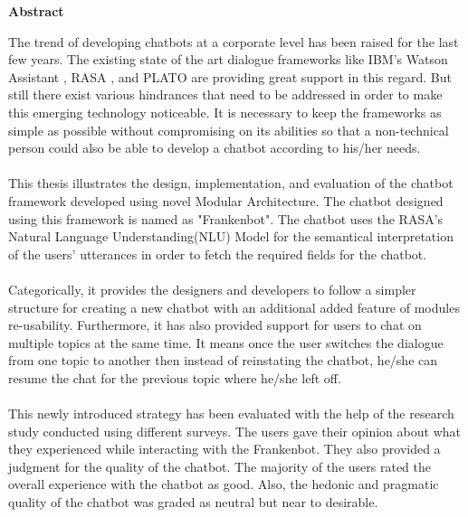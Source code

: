 \thispagestyle{empty}
\vspace*{1.0cm}

\begin{center}
    \textbf{Abstract}
\end{center}

\vspace*{0.5cm}

\noindent
The trend of developing chatbots at a corporate level has been raised for the last few years. The existing state of the art dialogue frameworks like IBM's Watson Assistant \cite{ibmwatson}, RASA \cite{rasa}, and PLATO \cite{plato} are providing great support in this regard. But still there exist various hindrances that need to be addressed in order to make this emerging technology noticeable. It is necessary to keep the frameworks as simple as possible without compromising on its abilities so that a non-technical person could also be able to develop a chatbot according to his/her needs.
\\~\\
This thesis illustrates the design, implementation, and evaluation of the chatbot framework developed using novel Modular Architecture. The chatbot designed using this framework is named as "Frankenbot". The chatbot uses the RASA's Natural Language Understanding(NLU) Model for the semantical interpretation of the users' utterances in order to fetch the required fields for the chatbot. 
\\~\\
Categorically, it provides the designers and developers to follow a simpler structure for creating a new chatbot with an additional added feature of modules re-usability. Furthermore, it has also provided support for users to chat on multiple topics at the same time. It means once the user switches the dialogue from one topic to another then instead of reinstating the chatbot, he/she can resume the chat for the previous topic where he/she left off.
\\~\\
This newly introduced strategy has been evaluated with the help of the research study conducted using different surveys. The users gave their opinion about what they experienced while interacting with the Frankenbot. They also provided a judgment for the quality of the chatbot. The majority of the users rated the overall experience with the chatbot as good. Also, the hedonic and pragmatic quality of the chatbot was graded as neutral but near to desirable.

 
 



